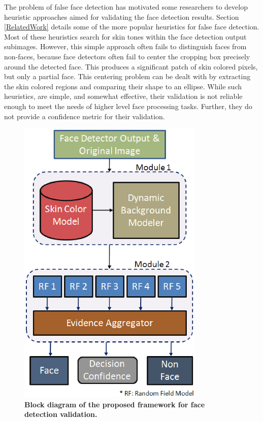 \documentclass[times, 10pt,twocolumn]{article}
\begin{document}
The problem of false face detection has motivated some researchers
to develop heuristic approaches aimed for
validating the face detection results.
Section \ref{RelatedWork} details some of the more popular
heuristics for false face detection. Most of these heuristics
search for skin tones within the face detection output subimages.
However, this simple approach often fails to distinguish faces from non-faces,
because face detectors often fail to
center the cropping box precisely around the detected face. This produces a
significant patch of skin colored pixels, but only a partial face.
This centering problem can be dealt with by extracting the skin colored regions
and comparing their shape to an ellipse. While such heuristics,
are simple, and somewhat effective, their validation is not reliable
enough to meet the needs of higher level face processing tasks.
Further, they do not provide a confidence metric for their
validation.
\begin{figure}[h]
\centering
\includegraphics[width=3.5in]{Figure2.eps}
\caption{{\bf {\selectfont Block diagram of the
proposed framework for face detection validation.}}}
\label{Fig:BlockDiagram}
\end{figure}
\end{document}
